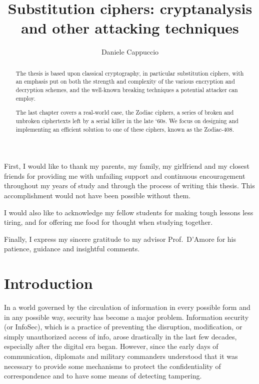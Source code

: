 \documentclass[Lau,binding=0.6cm,oneside]{sapthesis}
\title{Substitution ciphers: cryptanalysis \\and other attacking techniques}
\author{Daniele Cappuccio}
\begin{document}
\frontmatter

\maketitle

\dedication{Dedicated to\\Alan Turing}

\begin{abstract}

The thesis is based upon classical cryptography, in particular substitution ciphers, with an emphasis put on both the strength and complexity of the various encryption and decryption schemes, and the well-known breaking techniques a potential attacker can employ.

The last chapter covers a real-world case, the Zodiac ciphers, a series of broken and unbroken ciphertexts left by a serial killer in the late `60s. We focus on designing and implementing an efficient solution to one of these ciphers, known as the \textsf{Zodiac-408}.

\end{abstract}

\begin{acknowledgments}

First, I would like to thank my parents, my family, my girlfriend and my closest friends for providing me with unfailing support and continuous encouragement throughout my years of study and through the process of writing this thesis. This accomplishment would not have been possible without them.

I would also like to acknowledge my fellow students for making tough lessons less tiring, and for offering me food for thought when studying together.

Finally, I express my sincere gratitude to my advisor Prof.\ D'Amore for his patience, guidance and insightful comments.
\end{acknowledgments}

\tableofcontents

\mainmatter

\chapter{Introduction}
In a world governed by the circulation of information in every possible form and in any possible way, security has become a major problem. Information security (or InfoSec), which is a practice of preventing the disruption, modification, or simply unauthorized access of info, arose drastically in the last few decades, especially after the digital era began. However, since the early days of communication, diplomats and military commanders understood that it was necessary to provide some mechanisms to protect the confidentiality of correspondence and to have some means of detecting tampering.
\end{document}
